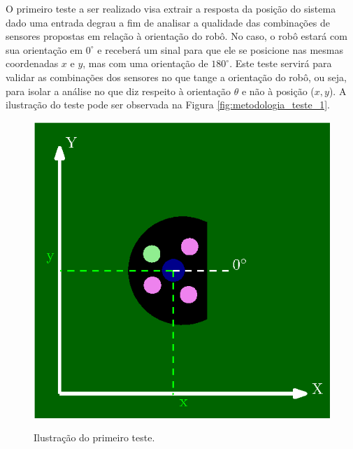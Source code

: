 \documentclass[acronym, symbols, table]{fei}
\begin{document}
		O primeiro teste a ser realizado visa extrair a resposta da posição do sistema dado uma entrada degrau a fim de analisar a qualidade das combinações de sensores propostas em relação à orientação do robô. No caso, o robô estará com sua orientação em $0^\circ$ e receberá um sinal para que ele se posicione nas mesmas coordenadas $x$ e $y$, mas com uma orientação de $180^\circ$. Este teste servirá para validar as combinações dos sensores no que tange a orientação do robô, ou seja, para isolar a análise no que diz respeito à orientação $\theta$ e não à posição ($x, y$). A ilustração do teste pode ser observada na Figura \ref{fig:metodologia_teste_1}.
		
		\begin{figure}[!htb]
			\caption{Ilustração do primeiro teste.}%
			\label{fig:metodologia_teste_1}
			\begin{minipage}{0.45\textwidth}
				\centering
				\includegraphics[width=\linewidth]{teste_1_0_graus.eps}
				\label{fig:metodologia_teste_1_a}
			\end{minipage}
			\hfill
			\begin{minipage}{0.45\textwidth}
				\centering

\end{minipage}
\end{figure}
\end{document}
